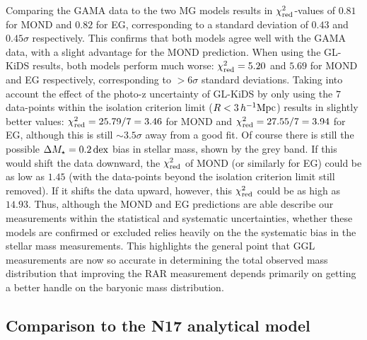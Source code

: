 \documentclass[usenatbib]{mnras}
\newcommand{\hMpc}{\, h^{-1}{\rm{Mpc}} }
\newcommand{\un}[1]{_{\rm #1}}
\newcommand{\dex}{\, {\rm dex}}
\begin{document}
Comparing the GAMA data to the two MG models results in $\chi\un{red}^2$-values of $0.81$ for MOND and $0.82$ for EG, corresponding to a standard deviation of $0.43$ and $0.45 \sigma$ respectively. This confirms that both models agree well with the GAMA data, with a slight advantage for the MOND prediction. When using the GL-KiDS results, both models perform much worse: $\chi\un{red}^2=5.20$ and $5.69$ for MOND and EG respectively, corresponding to $>6 \sigma$ standard deviations. Taking into account the effect of the photo-z uncertainty of GL-KiDS by only using the $7$ data-points within the isolation criterion limit ($R < 3 \hMpc$) results in slightly better values: $\chi\un{red}^2 = 25.79/7 = 3.46$ for MOND and $\chi\un{red}^2 = 27.55/7 = 3.94$ for EG, although this is still $\sim3.5 \sigma$ away from a good fit. Of course there is still the possible $\Delta M_\star = 0.2 \dex$ bias in stellar mass, shown by the grey band. If this would shift the data downward, the $\chi\un{red}^2$ of MOND (or similarly for EG) could be as low as $1.45$ (with the data-points beyond the isolation criterion limit still removed). If it shifts the data upward, however, this $\chi\un{red}^2$ could be as high as $14.93$. Thus, although the MOND and EG predictions are able describe our measurements within the statistical and systematic uncertainties, whether these models are confirmed or excluded relies heavily on the the systematic bias in the stellar mass measurements. This highlights the general point that GGL measurements are now so accurate in determining the total observed mass distribution that improving the RAR measurement depends primarily on getting a better handle on the baryonic mass distribution.

\subsection{Comparison to the N17 analytical model}
\end{document}
